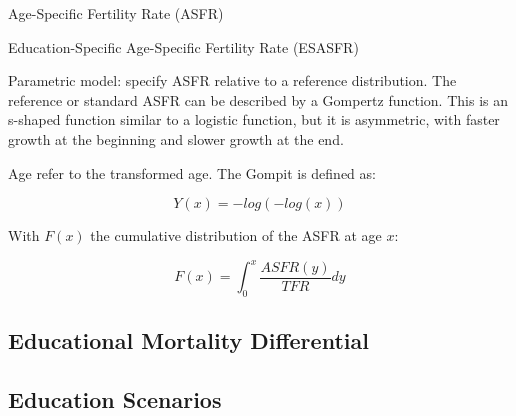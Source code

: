 Age-Specific Fertility Rate (ASFR)

Education-Specific Age-Specific Fertility Rate (ESASFR)

Parametric model: 
specify ASFR relative to a reference distribution. 
The reference or standard ASFR can be 
described by a Gompertz function. This 
is an s-shaped function similar to a 
logistic function, but it is asymmetric, 
with faster growth at the beginning and
slower growth at the end.

Age refer to the transformed age. The Gompit is 
defined as:

\begin{equation}
    Y(x) = -log(-log(x))
\end{equation}

With $F(x)$ the cumulative distribution of the ASFR 
at age $x$:

\begin{equation}
F(x) = \int_{0}^{x} \frac{ASFR(y)}{TFR}dy
\end{equation}

\subsection{Educational Mortality Differential}


\subsection{Education Scenarios}